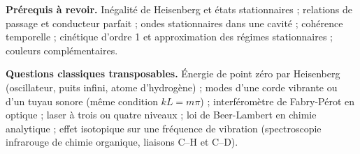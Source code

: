 \documentclass[11pt,a4paper]{article}
\begin{document}
\textbf{Prérequis à revoir.} Inégalité de Heisenberg et états stationnaires ; relations de passage et conducteur parfait ; ondes stationnaires dans une cavité ; cohérence temporelle ; cinétique d'ordre 1 et approximation des régimes stationnaires ; couleurs complémentaires.

\textbf{Questions classiques transposables.} Énergie de point zéro par Heisenberg (oscillateur, puits infini, atome d'hydrogène) ; modes d'une corde vibrante ou d'un tuyau sonore (même condition \(kL=m\pi\)) ; interféromètre de Fabry-Pérot en optique ; laser à trois ou quatre niveaux ; loi de Beer-Lambert en chimie analytique ; effet isotopique sur une fréquence de vibration (spectroscopie infrarouge de chimie organique, liaisons C--H et C--D).
\end{document}
